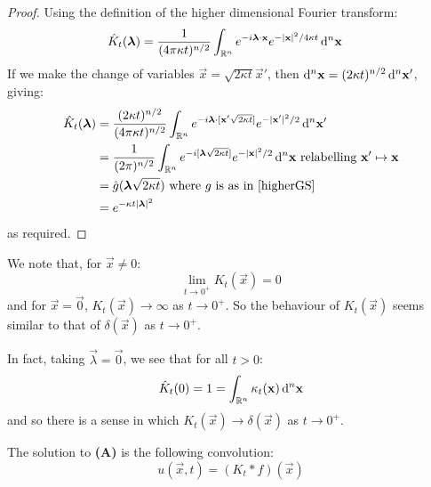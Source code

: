 \documentclass[../main.tex]{subfiles}
\begin{document}
\begin{proof}
  Using the definition of the higher dimensional Fourier transform:
  \begin{align*}
    \hat{K}_t(\vec{\lambda}) &= \frac{1}{(4 \pi \kappa t)^{n/2}} \int_{\R^{n}}  e^{-i \vec{\lambda} \cdot \vec{x}} e^{-|\vec{x}|^2/4\kappa t} \d^{n}{\vec{x}}
  \end{align*}
  If we make the change of variables $\vec{x} = \sqrt{2\kappa t} \vec{x}'$, then $\d^{n}{\vec{x}} = (2 \kappa t)^{n/2} \d^{n}{\vec{x}'}$, giving:
  \begin{align*}
    \hat{K}_t(\vec{\lambda}) &= \frac{(2 \kappa t)^{n/2}}{(4\pi \kappa t)^{n/2}} \int_{\R^{n}} e^{-i \vec{\lambda} \cdot [\vec{x}' \sqrt{2 \kappa t}]} e^{-|\vec{x}'|^2/2} \d^{n}{\vec{x}'} \\
                             &= \frac{1}{(2\pi)^{n/2}} \int_{\R^{n}} e^{-i[\vec{\lambda}\sqrt{2 \kappa t}]} e^{-|\vec{x}|^2/2} \d^{n}{\vec{x}} \text{ relabelling } \vec{x}' \mapsto \vec{x}\\
                             &= \hat{g}(\vec{\lambda} \sqrt{2 \kappa t}) \text{ where $g$ is as in \cref{higherGS}} \\
                             &= e^{-\kappa t |\vec{\lambda}|^2}
  \end{align*}
  as required.
\end{proof}
\begin{remark}
  \nonexaminable
  We note that, for $\vec{x} \neq 0$:
  \[
    \lim_{t \to 0^{+}} K_t(\vec{x}) = 0
  \]
  and for $\vec{x} = \vec{0}$, $K_t(\vec{x}) \to \infty$ as $t \to 0^{+}$.
  So the behaviour of $K_t(\vec{x})$ seems similar to that of $\delta(\vec{x})$ as $t \to 0^{+}$.

  In fact, taking $\vec{\lambda} = \vec{0}$, we see that for all $t > 0$:
  \[
    \hat{K}_t(0) = 1 = \int_{\R^{n}} \kappa_t(\vec{x}) \d^{n}{\vec{x}}
  \]
  and so there is a sense in which $K_t(\vec{x}) \to \delta(\vec{x})$ as $t \to 0^{+}$.
\end{remark}
\begin{proposition}
  The solution to \textbf{(A)} is the following convolution:
  \[
    u(\vec{x}, t) = (K_t \ast f)(\vec{x})
  \]
\end{proposition}
\end{document}
